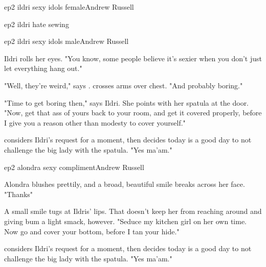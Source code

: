 \documentclass{book}
\begin{document}
\begin{childnode}{ep2 ildri sexy idols female}{Andrew Russell}




    {ep2 ildri hate sewing}

\end{childnode}

\begin{childnode}{ep2 ildri sexy idols male}{Andrew Russell}

    Ildri rolls her eyes. "You know, some people believe it's sexier when you don't just let everything hang out."

    "Well, they're weird," says \name{}. \HeShe{} crosses \hisher{} arms over \hisher{} chest. "And probably boring."

    "Time to get boring then," says Ildri. She points with her spatula at the door. "Now, get that ass of yours back to your room, and get it covered properly, before I give you a reason other than 
    modesty to cover yourself."

    \name{} considers Ildri's request for a moment, then decides today is a good day to not challenge the big lady with the spatula. "Yes ma'am."


\end{childnode}

\begin{childnode}{ep2 alondra sexy compliment}{Andrew Russell}

    Alondra blushes prettily, and a broad, beautiful smile breaks across her face. "Thanks"

    A small smile tugs at Ildris' lips. That doesn't keep her from reaching around and giving \names{} bum a light smack, however. "Seduce my kitchen girl on her own time. Now go and cover your 
    bottom, before I tan your hide."

    \name{} considers Ildri's request for a moment, then decides today is a good day to not challenge the big lady with the spatula. "Yes ma'am."

    
\end{childnode}
\end{document}
